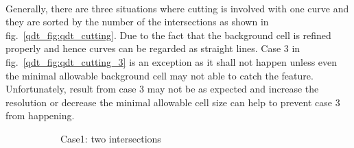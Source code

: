 \paragraph{}
Generally, there are three situations where cutting is involved with one curve and they are sorted by the number of the intersections as shown in fig.~\ref{qdt_fig:qdt_cutting}.
Due to the fact that the background cell is refined properly and hence curves can be regarded as straight lines.
Case 3 in fig.~\ref{qdt_fig:qdt_cutting_3} is an exception as it shall not happen unless even the minimal allowable background cell may not able to catch the feature.
Unfortunately, result from case 3 may not be as expected and increase the resolution or decrease the minimal allowable cell size can help to prevent case 3 from happening.
\begin{figure}[h!]
    \begin{subfigure}[b]{0.3\linewidth}
        \caption{Case1: two intersections}
        \label{qdt_fig:qdt_cutting_2}
    \end{subfigure}
    \begin{subfigure}[b]{0.3\linewidth}
        \label{qdt_fig:qdt_cutting_1}

\end{subfigure}
\end{figure}
